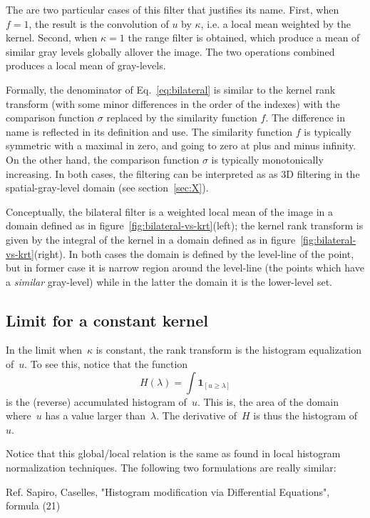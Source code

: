 \documentclass[12pt]{article}                  %
\begin{document}
The are two particular cases of this filter that justifies its name.  First,
when $f=1$, the result is the convolution of $u$ by $\kappa$, i.e. a local mean
weighted by the kernel.  Second, when $\kappa=1$ the range filter is obtained,
which produce a mean of similar gray levels globally allover the image.  The
two operations combined produces a local mean of gray-levels.

Formally, the denominator of Eq.~\ref{eq:bilateral} is similar to the kernel
rank transform (with some minor differences in the order of the indexes) with
the comparison function $\sigma$ replaced by the similarity function $f$.
The difference in name is reflected in its definition and use.  The similarity
function $f$ is typically symmetric with a maximal in zero, and going to
zero at plus and minus infinity.  On the other hand, the comparison function
$\sigma$ is typically monotonically increasing.  In both cases, the filtering
can be interpreted as as 3D filtering in the spatial-gray-level domain (see
section~\ref{sec:X}).

Conceptually, the bilateral filter is a weighted local mean of the image in a
domain defined as in figure~\ref{fig:bilateral-vs-krt}(left); the kernel rank
transform is given by the integral of the kernel in a domain defined as in
figure~\ref{fig:bilateral-vs-krt}(right).  In both cases the domain is defined
by the level-line of the point, but in former case it is narrow region around
the level-line (the points which have a \emph{similar} gray-level) while in the
latter the domain it is the lower-level set.


\subsection{Limit for a constant kernel}

In the limit when~$\kappa$ is constant, the rank transform is the histogram
equalization of~$u$.  To see this, notice that the function
\[
H(\lambda) = \int\mathbf{1}_{[u\ge\lambda]}
\]
is the (reverse) accumulated histogram of~$u$.  This is, the area of the domain
where~$u$ has a value larger than~$\lambda$.  The derivative of~$H$ is thus the
histogram of~$u$.

Notice that this global/local relation is the same as found in local
histogram normalization techniques.
The following two formulations are really similar:

Ref. Sapiro, Caselles,  "Histogram modification via Differential Equations",
formula (21)~\cite{sapiro1997histogram}
\end{document}
